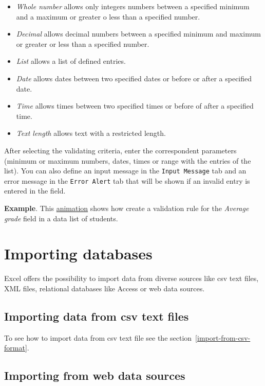 \begin{itemize}
\item \emph{Whole number} allows only integers numbers between a specified minimum and a maximum or greater o less than a specified number.
\item \emph{Decimal} allows decimal numbers between a specified minimum and maximum or greater or less than a specified number.
\item \emph{List} allows a list of defined entries.
\item \emph{Date} allows dates between two specified dates or before or after a specified date.
\item \emph{Time} allows times between two specified times or before of after a specified time.
\item \emph{Text length} allows text with a restricted length.
\end{itemize}

After selecting the validating criteria, enter the correspondent parameters (minimum or maximum numbers, dates, times or range with the entries of the list). You can also define an input message in the \texttt{Input Message} tab and an error message in the \texttt{Error Alert} tab that will be shown if an invalid entry is entered in the field.

\textbf{Example}. This \href{http://aprendeconalf.es/office/excel/manual/img/example_data_validation.gif}{animation} shows how create a validation rule for the \emph{Average grade} field in a data list of students.

\section{Importing databases}\hypertarget{importing-databases}{}\label{importing-databases}

Excel offers the possibility to import data from diverse sources like csv text files, XML files, relational databases like Access or web data sources.

\subsection{Importing data from csv text files}\hypertarget{importing-data-from-csv-text-files}{}\label{importing-data-from-csv-text-files}

To see how to import data from csv text file see the section~\ref{import-from-csv-format}.

\subsection{Importing from web data sources}\hypertarget{importing-from-web-data-sources}{}\label{importing-from-web-data-sources}

